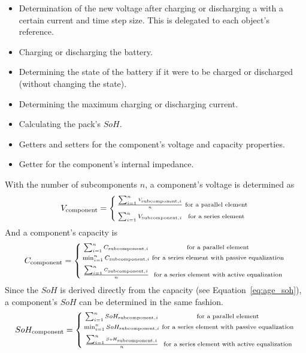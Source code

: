 \begin{itemize}
	\item Determination of the new voltage after charging or discharging a with a certain current and time step size. This is delegated to each  object's  reference.
	\item Charging or discharging the battery.
	\item Determining the state of the battery if it were to be charged or discharged (without changing the state).
	\item Determining the maximum charging or discharging current.
	\item Calculating the pack's $SoH$.
	\item Getters and setters for the component's voltage and capacity properties.
	\item Getter for the component's internal impedance. 
\end{itemize}
With the number of subcomponents $n$, a component's voltage is determined as
\begin{equation} 
V_\text{component} = \left\lbrace
\begin{smallmatrix}
\frac{\sum_{i=1}^{n}V_{\text{subcomponent}, i}}{n} & \text{for a parallel element}\\
& \\
\sum_{i=1}^{n}V_{\text{subcomponent}, i} & \text{for a series element} \\
\end{smallmatrix}
\right.
\end{equation}
And a component's capacity is
\begin{equation}
C_\text{component} = \left\lbrace
\begin{smallmatrix}
\sum_{i=1}^{n}C_{\text{subcomponent}, i} & \text{for a parallel element}\\
& \\
\min_{i=1}^{n}C_{\text{subcomponent}, i} & \text{for a series element with passive equalization} \\
& \\
\frac{\sum_{i=1}^{n}C_{\text{subcomponent}, i}}{n} & \text{for a series element with active equalization}\\
\end{smallmatrix}
\right.
\end{equation}
Since the $SoH$ is derived directly from the capacity (see Equation~\ref{eq:age_soh}), a component's $SoH$ can be determined in the same fashion.
\begin{equation}
SoH_\text{component} = \left\lbrace
\begin{smallmatrix}
\sum_{i=1}^{n}SoH_{\text{subcomponent}, i} & \text{for a parallel element}\\
& \\
\min_{i=1}^{n}SoH_{\text{subcomponent}, i} & \text{for a series element with passive equalization} \\
& \\
\frac{\sum_{i=1}^{n}SoH_{\text{subcomponent}, i}}{n} & \text{for a series element with active equalization}\\
\end{smallmatrix}
\right.
\end{equation}

